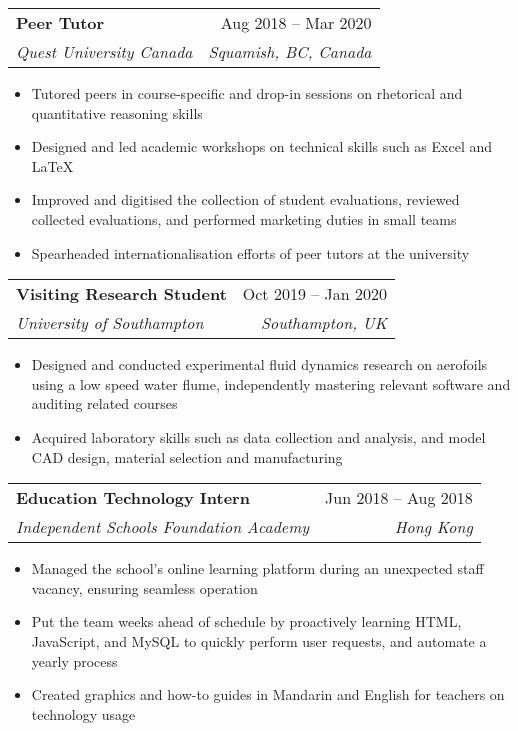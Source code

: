 \documentclass[a4paper,11pt]{article}
\makeatletter
\newcommand{\resumeItem}[1]{
  \item\small{
    {#1\vspace{-2pt}}
  }
}
\newcommand{\resumeSubheading}[4]{
  \vspace{-2pt}\item
    \begin{tabular*}{0.97\textwidth}[t]{l@{\extracolsep{\fill}}r}
      \textbf{#1} & #2 \\
      \textit{\small#3} & \textit{\small #4} \\
    \end{tabular*}\vspace{-7pt}
}
\newcommand{\resumeSubSubheading}[2]{
    \item
    \begin{tabular*}{0.97\textwidth}{l@{\extracolsep{\fill}}r}
      \textit{\small#1} & \textit{\small #2} \\
    \end{tabular*}\vspace{-7pt}
}
\newcommand{\resumeSubHeadingListEnd}{\end{itemize}}
\newcommand{\resumeItemListStart}{\begin{itemize}}
\newcommand{\resumeItemListEnd}{\end{itemize}\vspace{-5pt}}
\makeatother
\begin{document}
    \resumeSubheading
      {Peer Tutor}{Aug 2018 -- Mar 2020}
      {Quest University Canada}{Squamish, BC, Canada}
      \resumeItemListStart
      \resumeItem{Tutored peers in course-specific and drop-in sessions on rhetorical and quantitative reasoning skills}%
        \resumeItem{Designed and led academic workshops on technical skills such as Excel and LaTeX}
        \resumeItem{Improved and digitised the collection of student evaluations, reviewed collected evaluations, and performed marketing duties in small teams}
        \resumeItem{Spearheaded internationalisation efforts of peer tutors at the university}
      \resumeItemListEnd
      
    \resumeSubheading
      {Visiting Research Student}{Oct 2019 -- Jan 2020}
      {University of Southampton}{Southampton, UK}
      \resumeItemListStart
      \resumeItem{Designed and conducted experimental fluid dynamics research on aerofoils using a low speed water flume, independently mastering relevant software and auditing related courses}
        \resumeItem{Acquired laboratory skills such as data collection and analysis, and model CAD design, material selection and manufacturing}
      \resumeItemListEnd
      

    \resumeSubheading
      {Education Technology Intern}{Jun 2018 -- Aug 2018}
      {Independent Schools Foundation Academy}{Hong Kong}
      \resumeItemListStart
        \resumeItem{Managed the school's online learning platform during an unexpected staff vacancy, ensuring seamless operation}
        \resumeItem{Put the team weeks ahead of schedule by proactively learning HTML, JavaScript, and MySQL to quickly perform user requests, and automate a yearly process}%
        \resumeItem{Created graphics and how-to guides
        in Mandarin and English for teachers on technology usage}
      \resumeItemListEnd
    
\end{document}
